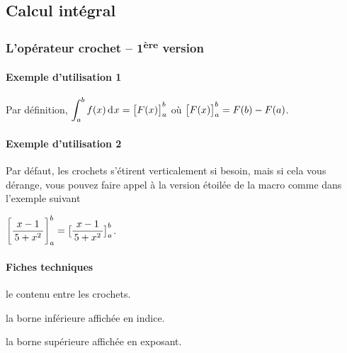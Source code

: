 \documentclass[12pt,a4paper]{article}
\theoremstyle{definition}
\begin{document}

\subsection{Calcul intégral}

\subsubsection{L'opérateur crochet -- 1\textsuperscript{ère} version}

\paragraph{Exemple d'utilisation 1}

\begin{tcblisting}{}
Par définition, $\displaystyle \int_{a}^{b} f(x) \dd{x} = \hook{F(x)}{a}{b}$ où
$\hook{F(x)}{a}{b} = F(b) - F(a)$.
\end{tcblisting}


\paragraph{Exemple d'utilisation 2}

Par défaut, les crochets s'étirent verticalement si besoin, mais si cela vous dérange, vous pouvez faire appel à la version étoilée de la macro comme dans l'exemple suivant

\begin{tcblisting}{}
$\displaystyle \hook{\frac{x - 1}{5 + x^2}}{a}{b}
             = \hook*{\frac{x - 1}{5 + x^2}}{a}{b}$.
\end{tcblisting}


\paragraph{Fiches techniques}



 le contenu entre les crochets.

 la borne inférieure affichée en indice.

 la borne supérieure affichée en exposant.
\end{document}
